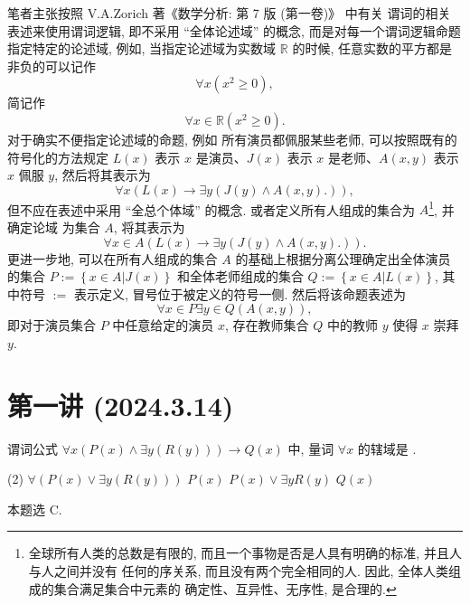 \documentclass[10pt,UTF8]{book} %
\begin{document}
笔者主张按照 V.A.Zorich 著《数学分析: 第 7 版 (第一卷)》\cite{zorich1} 中有关
谓词的相关表述来使用谓词逻辑, 即不采用 “全体论述域” 的概念, 而是对每一个谓词逻辑命题
指定特定的论述域, 例如, 当指定论述域为实数域 $\mathbb{R}$ 的时候, 任意实数的平方都是非负的可以记作
\[ \forall x \left( x^2 \geqslant 0 \right), \]
简记作
\[ \forall x \in \mathbb{R} \left( x^2 \geqslant 0 \right). \]
对于确实不便指定论述域的命题, 例如 {\kaishu 所有演员都佩服某些老师},
可以按照既有的符号化的方法规定
$L(x)$ 表示 $x$ 是演员、$J(x)$ 表示 $x$ 是老师、$A(x,y)$ 表示 $x$ 佩服 $y$,
然后将其表示为
\[ \forall x \left( L(x) \to \exists y \left(
        J(y) \wedge A(x,y).
\right) \right), \]
但不应在表述中采用 “全总个体域” 的概念. 或者定义所有人组成的集合为 $A$\footnote{
    全球所有人类的总数是有限的, 而且一个事物是否是人具有明确的标准, 并且人与人之间并没有
    任何的序关系, 而且没有两个完全相同的人. 因此, 全体人类组成的集合满足集合中元素的
    确定性、互异性、无序性, 是合理的.
}, 并确定论域
为集合 $A$, 将其表示为
\[ \forall x \in A \left( L(x) \to \exists y \left(
    J(y) \wedge A(x,y).
\right) \right). \]
更进一步地, 可以在所有人组成的集合 $A$ 的基础上根据分离公理确定出全体演员的集合 $P
:= \left\{ x \in A | J(x) \right\}$ 和全体老师组成的集合
$Q := \left\{ x \in A | L(x) \right\}$, 
其中符号 $:=$ 表示定义, 冒号位于被定义的符号一侧.
然后将该命题表述为
\[ \forall x \in P\exists y \in Q \left( A(x, y) \right), \]
即{\kaishu 对于演员集合 $P$ 中任意给定的演员 $x$, 存在教师集合 $Q$ 中的教师 $y$ 使得 $x$ 崇拜 $y$}.

\section{第一讲 (2024.3.14)}

\begin{exercise}
    谓词公式 $\forall x \left(
        P(x) \wedge \exists y \left( R(y) \right)
    \right) \to Q(x)$
    中, 量词 $\forall x$ 的辖域是 \underline{\qquad \qquad \qquad}.
    \begin{tasks}[label={\Alph*.}](2)
        \task $\forall \left(
            P(x) \vee \exists y \left( R(y) \right)
        \right)$
        \task $P(x)$
        \task $P(x) \vee \exists y R(y)$
        \task $Q(x)$
    \end{tasks}
    \begin{sol}
        本题选 C.
    \end{sol}
\end{exercise}
\end{document}
